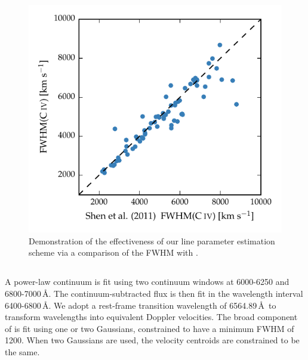 \begin{figure}
    \centering 
    \includegraphics[width=0.8\linewidth]{figures/chapter03/shen_comparison_civ.pdf} 
    \caption{Demonstration of the effectiveness of our line parameter estimation scheme via a comparison of the  FWHM with \citet{shen11}.} 
    \label{fig:shen_comparison_civ}
\end{figure}

\subsection{\ha}
\label{sec:ha}


A power-law continuum is fit using two continuum windows at 6000-6250 and 6800-7000\,\AA. 
The continuum-subtracted flux is then fit in the wavelength interval 6400-6800\,\AA. 
We adopt a rest-frame transition wavelength of 6564.89\,\AA\, to transform wavelengths into equivalent Doppler velocities. 
The broad component of \ha is fit using one or two Gaussians, constrained to have a minimum FWHM of 1200\kms. When two Gaussians are used, the velocity centroids are constrained to be the same.

